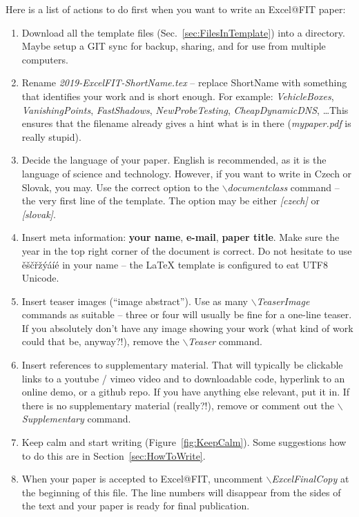 \documentclass{ExcelAtFIT}
\begin{document}
Here is a list of actions to do first when you want to write an Excel@FIT paper:
\begin{enumerate}
	\item Download all the template files (Sec.~\ref{sec:FilesInTemplate}) into a directory. Maybe setup a GIT sync for backup, sharing, and for use from multiple computers.
	\item Rename \textit{2019-ExcelFIT-ShortName.tex} -- replace ShortName with something that identifies your work and is short enough.  For example: \textit{VehicleBoxes}, \textit{VanishingPoints}, \textit{FastShadows}, \textit{NewProbeTesting}, \textit{CheapDynamicDNS}, \ldots  This ensures that the filename already gives a hint what is in there (\textit{mypaper.pdf} is really stupid).
	\item Decide the language of your paper.  English is recommended, as it is the language of science and technology.  However, if you want to write in Czech or Slovak, you may.  Use the correct option to the \textit{$\backslash$documentclass} command -- the very first line of the template.  The option may be either \textit{[czech]} or \textit{[slovak]}.
	\item Insert meta information: \textbf{your name}, \textbf{e-mail}, \textbf{paper title}.  Make sure the year in the top right corner of the document is correct.  Do not hesitate to use ěščřžýáíé in your name -- the \LaTeX{} template is configured to eat UTF8 Unicode.
	\item Insert teaser images (``image abstract'').  Use as many \textit{$\backslash$TeaserImage} commands as suitable -- three or four will usually be fine for a one-line teaser.  If you absolutely don't have any image showing your work (what kind of work could that be, anyway?!), remove the \textit{$\backslash$Teaser} command.
	\item Insert references to supplementary material.  That will typically be clickable links to a youtube / vimeo video and to downloadable code, hyperlink to an online demo, or a github repo. If you have anything else relevant, put it in.  If there is no supplementary material (really?!), remove or comment out the \textit{$\backslash$Supplementary} command.
	\item Keep calm and start writing (Figure~\ref{fig:KeepCalm}).  Some suggestions how to do this are in Section~\ref{sec:HowToWrite}.
	\item When your paper is accepted to Excel@FIT, uncomment \textit{$\backslash$ExcelFinalCopy} at the beginning of this file.  The line numbers will disappear from the sides of the text and your paper is ready for final publication.
\end{enumerate}
\end{document}

